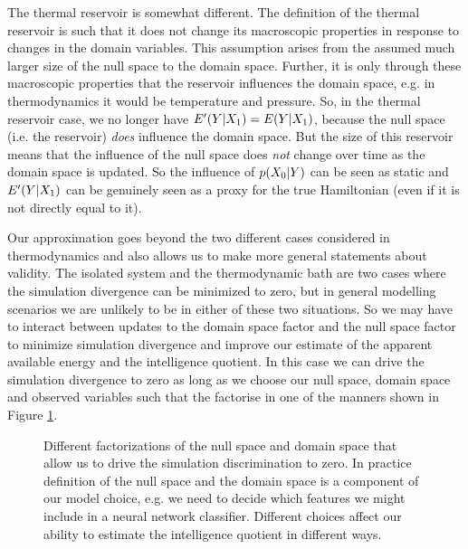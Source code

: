 \documentclass[]{article}
\begin{document}
The thermal reservoir is somewhat different. The definition of the thermal reservoir is such that it does not change its macroscopic properties in response to changes in the domain variables. This assumption arises from the assumed much larger size of the null space to the domain space. Further, it is only through these macroscopic properties that the reservoir influences the domain space, e.g. in thermodynamics it would be temperature and pressure. So, in the thermal reservoir case, we no longer have $E^\prime(Y |X_1) = E(Y |X_1)$, because the null space (i.e. the reservoir) \emph{does} influence the domain space. But the size of this reservoir means that the influence of the null space does \emph{not} change over time as the domain space is updated. So the influence of $p(X_0|Y)$ can be seen as static  and $E^\prime(Y |X_1)$ can be genuinely seen as a proxy for the true Hamiltonian (even if it is not directly equal to it).  

Our approximation goes beyond the two different cases considered in thermodynamics and also allows us to make more general statements about validity. The isolated system and the thermodynamic bath are two cases where the simulation divergence can be minimized to zero, but in general modelling scenarios we are unlikely to be in either of these two situations. So we may have to interact between updates to the domain space factor and the null space factor to minimize simulation divergence and improve our estimate of the apparent available energy and the intelligence quotient. In this case we can drive the simulation divergence to zero as long as we choose our null space, domain space and observed variables such that the factorise in one of the manners shown in Figure \ref{fig-null-space-factorisation}.

\begin{figure}
    \centering
    \caption{Different factorizations of the null space and domain space that allow us to drive the simulation discrimination to zero. In practice definition of the null space and the domain space is a component of our model choice, e.g. we need to decide which features we might include in a neural network classifier. Different choices affect our ability to estimate the intelligence quotient in different ways.}
    \label{fig-null-space-factorisation}
\end{figure}
\end{document}
